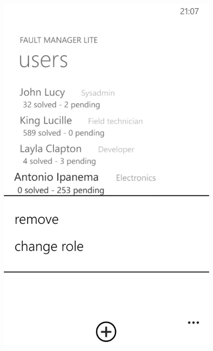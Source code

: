 \documentclass{report}
\begin{document}
\begin{figure}[hbtp]
\centering
\begin{minipage}{0.3\textwidth}
\includegraphics[width=\textwidth]{img/AssignRemoveUser.jpg}
\end{minipage}
\hspace{0.02\textwidth}
\begin{minipage}{0.3\textwidth}

\end{minipage}
\end{figure}
\end{document}
